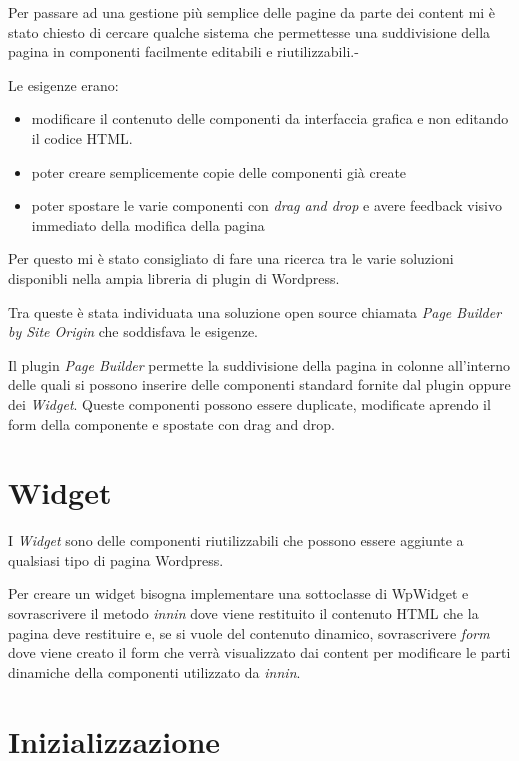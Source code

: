 


Per passare ad una gestione più semplice delle pagine da parte dei content
mi è stato chiesto di cercare qualche sistema che permettesse una suddivisione
della pagina in componenti facilmente editabili e riutilizzabili.-

Le esigenze erano:
\begin{itemize}
\item modificare il contenuto delle componenti da interfaccia grafica e non 
editando il codice HTML.
\item poter creare semplicemente copie delle componenti già create
\item poter spostare le varie componenti con \emph{drag and drop} e avere
feedback visivo immediato della modifica della pagina
\end{itemize}

Per questo mi è stato consigliato di fare una ricerca tra le varie soluzioni disponibli
nella ampia libreria di plugin di Wordpress.

Tra queste è stata individuata una soluzione open source chiamata \emph{Page Builder by
Site Origin} che soddisfava le esigenze.

Il plugin \emph{Page Builder} permette la suddivisione della pagina in colonne all'interno delle quali
si possono inserire delle componenti standard fornite dal plugin oppure dei \emph{Widget}.
Queste componenti possono essere duplicate, modificate aprendo il form della componente e spostate
con drag and drop.
\section{Widget}
I \emph{Widget} sono delle componenti riutilizzabili che possono essere aggiunte a qualsiasi
tipo di pagina Wordpress. 

Per creare un widget bisogna implementare una sottoclasse di WpWidget
e sovrascrivere il metodo \emph{innin} dove viene restituito il contenuto HTML che la pagina deve restituire
e, se si vuole del contenuto dinamico, sovrascrivere \emph{form} dove viene creato il form che verrà visualizzato dai content per modificare le
parti dinamiche della componenti utilizzato da \emph{innin}.

\section{Inizializzazione}
